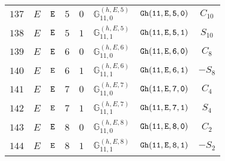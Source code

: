 \documentclass[fleqn,8pt]{jsarticle}
\begin{document}
\begin{table}[ht!]
\begin{center}
\begin{tabular}{cccccccc}
$ 137 $ & $ E $ & $ {\tt E} $ & $ 5 $ & $ 0 $ & $ \mathbb{G}_{11,0}^{(h,E,5)} $ & $ {\tt Gh(11,E,5,0)} $ & $ C_{10} $ \\
$ 138 $ & $ E $ & $ {\tt E} $ & $ 5 $ & $ 1 $ & $ \mathbb{G}_{11,1}^{(h,E,5)} $ & $ {\tt Gh(11,E,5,1)} $ & $ S_{10} $ \\
$ 139 $ & $ E $ & $ {\tt E} $ & $ 6 $ & $ 0 $ & $ \mathbb{G}_{11,0}^{(h,E,6)} $ & $ {\tt Gh(11,E,6,0)} $ & $ C_{8} $ \\
$ 140 $ & $ E $ & $ {\tt E} $ & $ 6 $ & $ 1 $ & $ \mathbb{G}_{11,1}^{(h,E,6)} $ & $ {\tt Gh(11,E,6,1)} $ & $ - S_{8} $ \\
$ 141 $ & $ E $ & $ {\tt E} $ & $ 7 $ & $ 0 $ & $ \mathbb{G}_{11,0}^{(h,E,7)} $ & $ {\tt Gh(11,E,7,0)} $ & $ C_{4} $ \\
$ 142 $ & $ E $ & $ {\tt E} $ & $ 7 $ & $ 1 $ & $ \mathbb{G}_{11,1}^{(h,E,7)} $ & $ {\tt Gh(11,E,7,1)} $ & $ S_{4} $ \\
$ 143 $ & $ E $ & $ {\tt E} $ & $ 8 $ & $ 0 $ & $ \mathbb{G}_{11,0}^{(h,E,8)} $ & $ {\tt Gh(11,E,8,0)} $ & $ C_{2} $ \\
$ 144 $ & $ E $ & $ {\tt E} $ & $ 8 $ & $ 1 $ & $ \mathbb{G}_{11,1}^{(h,E,8)} $ & $ {\tt Gh(11,E,8,1)} $ & $ - S_{2} $ \\
 \hline \hline
\end{tabular}
\end{center}
\end{table}
\end{document}
